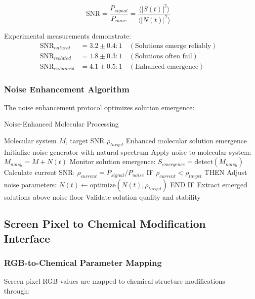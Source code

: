 \begin{equation}
\text{SNR} = \frac{P_{signal}}{P_{noise}} = \frac{\langle |S(t)|^2 \rangle}{\langle |N(t)|^2 \rangle}
\end{equation}

Experimental measurements demonstrate:
\begin{align}
\text{SNR}_{natural} &= 3.2 \pm 0.4 : 1 \quad (\text{Solutions emerge reliably}) \\
\text{SNR}_{isolated} &= 1.8 \pm 0.3 : 1 \quad (\text{Solutions often fail}) \\
\text{SNR}_{enhanced} &= 4.1 \pm 0.5 : 1 \quad (\text{Enhanced emergence})
\end{align}

\subsubsection{Noise Enhancement Algorithm}

The noise enhancement protocol optimizes solution emergence:

\begin{algorithm}[H]
\caption{Noise-Enhanced Molecular Processing}
\begin{algorithmic}[1]
\REQUIRE Molecular system $M$, target SNR $\rho_{target}$
\ENSURE Enhanced molecular solution emergence
\STATE Initialize noise generator with natural spectrum
\STATE Apply noise to molecular system: $M_{noisy} = M + N(t)$
\STATE Monitor solution emergence: $S_{emergence} = \text{detect}(M_{noisy})$
\STATE Calculate current SNR: $\rho_{current} = P_{signal}/P_{noise}$
\STATE IF $\rho_{current} < \rho_{target}$ THEN
\STATE \quad Adjust noise parameters: $N(t) \leftarrow \text{optimize}(N(t), \rho_{target})$
\STATE END IF
\STATE Extract emerged solutions above noise floor
\STATE Validate solution quality and stability
\end{algorithmic}
\end{algorithm}

\subsection{Screen Pixel to Chemical Modification Interface}

\subsubsection{RGB-to-Chemical Parameter Mapping}

Screen pixel RGB values are mapped to chemical structure modifications through:

